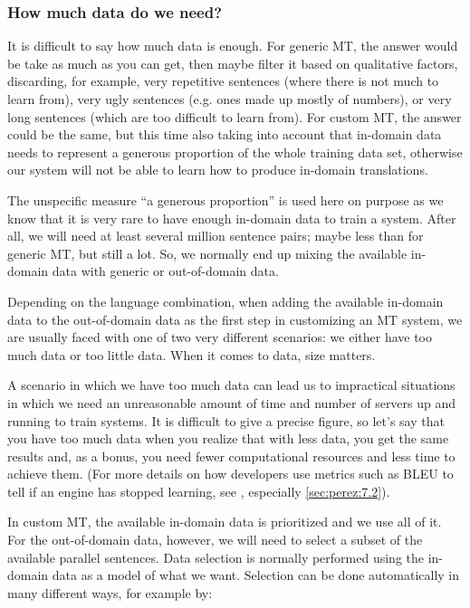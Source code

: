 \documentclass[output=paper]{langscibook}
\begin{document}
\subsubsection{How much data do we need?}\label{sec:howmuch}
It is difficult to say how much data is enough. For generic MT, the answer would be take as much as you can get, then maybe filter it based on qualitative factors,  discarding, for example, very repetitive sentences (where there is not much to learn from), very ugly sentences (e.g. ones made up mostly of numbers), or very long sentences (which are too difficult to learn from). For custom MT, the answer could be the same, but this time also taking into account that in-domain data needs to represent a generous proportion of the whole training data set, otherwise our system will not be able to learn how to produce in-domain translations.

The unspecific measure “a generous proportion” is used here on purpose as we know that it is very rare to have enough in-domain data to train a system. After all, we will need at least several million sentence pairs; maybe less than for generic MT, but still a lot. So, we normally end up mixing the available in-domain data with generic or out-of-domain data.

\begin{sloppypar}
Depending on the language combination, when adding the available in-domain data to the out-of-domain data as the first step in customizing an MT system, we are usually faced with one of two very different scenarios: we either have too much data or too little data. When it comes to data, size matters.
\end{sloppypar}


A scenario in which we have too much data can lead us to impractical situations in which we need an unreasonable amount of time and number of servers up and running to train systems. It is difficult to give a precise figure, so let’s say that you have too much data when you realize that with less data, you get the same results and, as a bonus, you need fewer computational resources and less time to achieve them. (For more details on how developers use metrics such as BLEU to tell if an engine has stopped learning, see , especially \ref{sec:perez:7.2}).

In custom MT, the available in-domain data is prioritized and we use all of it. For the out-of-domain data, however, we will need to select a subset of the available parallel sentences. Data selection is normally performed using the in-domain data as a model of what we want. Selection can be done automatically in many different ways, for example by:
\end{document}
